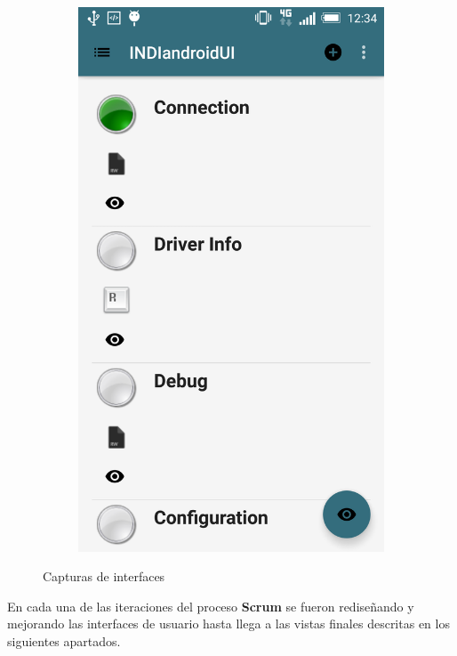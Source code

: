 \begin{figure}
\begin{subfigure}[]{0.4\textwidth}
        \includegraphics[width=\textwidth]{../images/captura5.png}
        \caption{}
        \label{fig:captura4}
    \end{subfigure}
    \caption{Capturas de interfaces}\label{fig:capturas2}
\end{figure}

\bigskip
En cada una de las iteraciones del proceso \textbf{Scrum} se fueron rediseñando y mejorando las interfaces de usuario hasta llega a las vistas finales descritas en los siguientes apartados.

